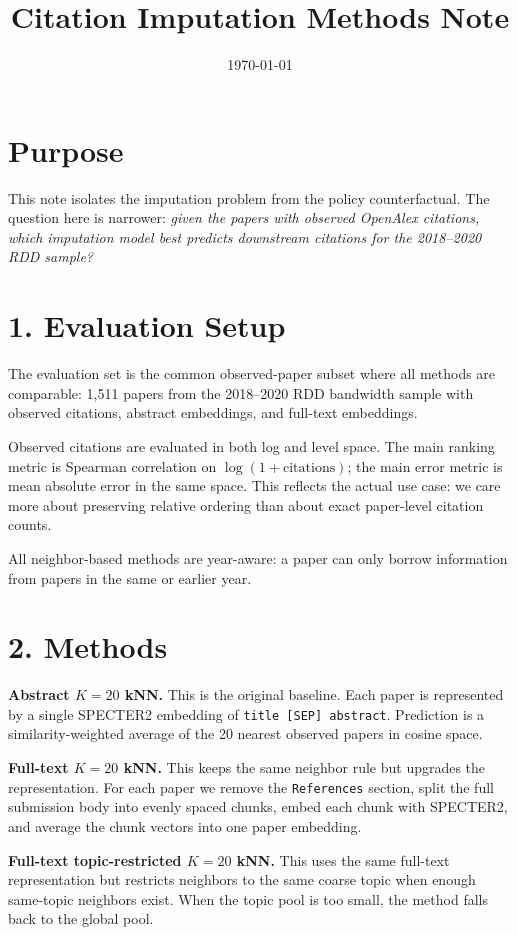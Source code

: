 \documentclass[11pt]{article}
\title{Citation Imputation Methods Note}
\author{}
\date{\today}
\begin{document}
\maketitle

\section*{Purpose}
This note isolates the imputation problem from the policy counterfactual. The
question here is narrower: \emph{given the papers with observed OpenAlex
citations, which imputation model best predicts downstream citations for the
2018--2020 RDD sample?}

\section*{1. Evaluation Setup}
The evaluation set is the common observed-paper subset where all methods are
comparable: 1{,}511 papers from the 2018--2020 RDD bandwidth sample with
observed citations, abstract embeddings, and full-text embeddings.

Observed citations are evaluated in both log and level space. The main ranking
metric is Spearman correlation on $\log(1+\text{citations})$; the main error
metric is mean absolute error in the same space. This reflects the actual use
case: we care more about preserving relative ordering than about exact
paper-level citation counts.

All neighbor-based methods are year-aware: a paper can only borrow information
from papers in the same or earlier year.

\section*{2. Methods}
\textbf{Abstract $K=20$ kNN.}
This is the original baseline. Each paper is represented by a single SPECTER2
embedding of \texttt{title [SEP] abstract}. Prediction is a similarity-weighted
average of the 20 nearest observed papers in cosine space.

\textbf{Full-text $K=20$ kNN.}
This keeps the same neighbor rule but upgrades the representation. For each
paper we remove the \texttt{References} section, split the full submission body
into evenly spaced chunks, embed each chunk with SPECTER2, and average the
chunk vectors into one paper embedding.

\textbf{Full-text topic-restricted $K=20$ kNN.}
This uses the same full-text representation but restricts neighbors to the same
coarse topic when enough same-topic neighbors exist. When the topic pool is too
small, the method falls back to the global pool.
\end{document}
